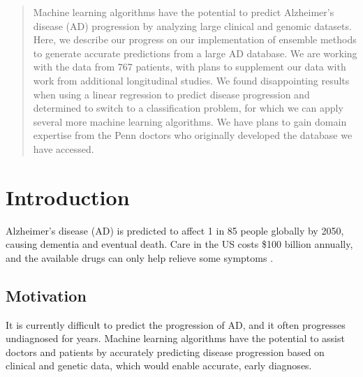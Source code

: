 \documentclass{article}
\begin{document}
 


\begin{abstract} 
Machine learning algorithms have the potential to predict Alzheimer's disease (AD) progression by analyzing large clinical and genomic datasets. Here, we describe our progress on our implementation of ensemble methods to generate accurate predictions from a large AD database. We are working with the data from 767 patients, with plans to supplement our data with work from additional longitudinal studies.  We found disappointing results when using a linear regression to predict disease progression and determined to switch to a classification problem, for which we can apply several more machine learning algorithms. We have plans to gain domain expertise from the Penn doctors who originally developed the database we have accessed.
\end{abstract} 


\section{Introduction}
Alzheimer's disease (AD) is predicted to affect 1 in 85 people globally by 2050, causing dementia and eventual death. Care in the US costs \$100 billion annually, and the available drugs can only help relieve some symptoms \cite{duthey13}.

\subsection{Motivation}
It is currently difficult to predict the progression of AD, and it often progresses undiagnosed for years. Machine learning algorithms have the potential to assist doctors and patients by accurately predicting disease progression based on clinical and genetic data, which would enable accurate, early diagnoses.
\end{document}
